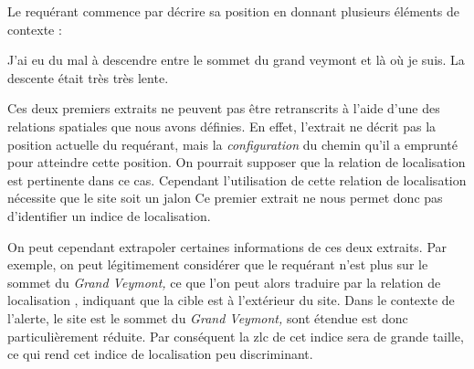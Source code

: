 Le requérant commence par décrire sa position en donnant plusieurs
éléments de contexte :
%
\begin{dialogue}
  \Req {} J'ai eu du mal à descendre entre le sommet du grand
veymont et là où je suis.  La descente était très très lente.
\end{dialogue}
%
Ces deux premiers extraits ne peuvent pas être retranscrits à l'aide
d'une des relations spatiales que nous avons définies. En effet,
l'extrait  ne décrit pas la position actuelle du requérant,
mais la \emph{configuration} du chemin qu'il a emprunté pour atteindre
cette position. On pourrait supposer que la relation de localisation
 est pertinente dans ce
cas. Cependant l'utilisation de cette relation de localisation
nécessite que le site soit un jalon 
%
Ce premier extrait ne nous permet donc pas d'identifier un indice de
localisation.

On peut cependant extrapoler certaines informations de ces deux
extraits. Par exemple, on peut légitimement considérer que le
requérant n'est plus sur le sommet du \emph{Grand Veymont,} ce que
l'on peut alors traduire par la relation de localisation
, indiquant que la cible est à
l'extérieur du site. Dans le contexte de l'alerte, le site est le
sommet du \emph{Grand Veymont,} sont étendue est donc particulièrement
réduite. Par conséquent la \ac{zlc} de cet indice sera de grande
taille, ce qui rend cet indice de localisation peu discriminant.

